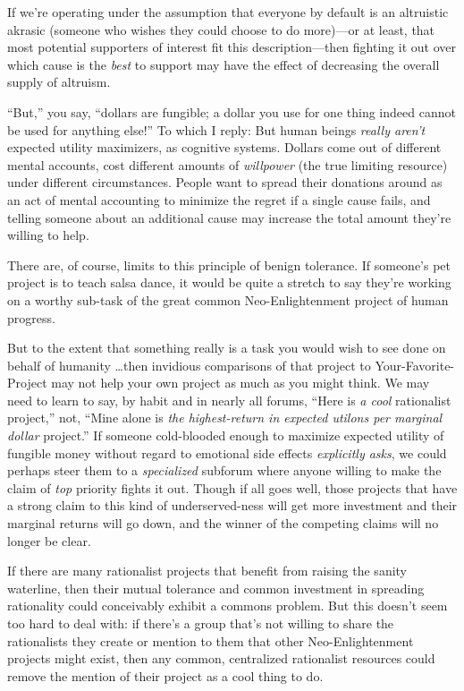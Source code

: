 {
 If we're operating under the assumption that
everyone by default is an altruistic akrasic (someone who wishes they
could choose to do more)---or at least, that most potential supporters
of interest fit this description---then fighting it out over which
cause is the \textit{best} to support may have the effect of decreasing
the overall supply of altruism.}

{
 ``But,'' you say,
``dollars are fungible; a dollar you use for one thing
indeed cannot be used for anything else!'' To which I
reply: But human beings \textit{really aren't} expected
utility maximizers, as cognitive systems. Dollars come out of different
mental accounts, cost different amounts of \textit{willpower} (the true
limiting resource) under different circumstances. People want to spread
their donations around as an act of mental accounting to minimize the
regret if a single cause fails, and telling someone about an additional
cause may increase the total amount they're willing to
help.}

{
 There are, of course, limits to this principle of benign
tolerance. If someone's pet project is to teach salsa
dance, it would be quite a stretch to say they're
working on a worthy sub-task of the great common Neo-Enlightenment
project of human progress.}

{
 But to the extent that something really is a task you would wish
to see done on behalf of humanity \ldots then invidious comparisons of
that project to Your-Favorite-Project may not help your own project as
much as you might think. We may need to learn to say, by habit and in
nearly all forums, ``Here is \textit{a cool}
rationalist project,'' not, ``Mine
alone is \textit{the highest-return in expected utilons per marginal
dollar} project.'' If someone cold-blooded enough to
maximize expected utility of fungible money without regard to emotional
side effects \textit{explicitly asks}, we could perhaps steer them to a
\textit{specialized} subforum where anyone willing to make the claim of
\textit{top} priority fights it out. Though if all goes well, those
projects that have a strong claim to this kind of underserved-ness will
get more investment and their marginal returns will go down, and the
winner of the competing claims will no longer be clear.}

{
 If there are many rationalist projects that benefit from raising
the sanity waterline, then their mutual tolerance and common investment
in spreading rationality could conceivably exhibit a commons problem.
But this doesn't seem too hard to deal with: if
there's a group that's not willing to
share the rationalists they create or mention to them that other
Neo-Enlightenment projects might exist, then any common, centralized
rationalist resources could remove the mention of their project as a
cool thing to do.}

